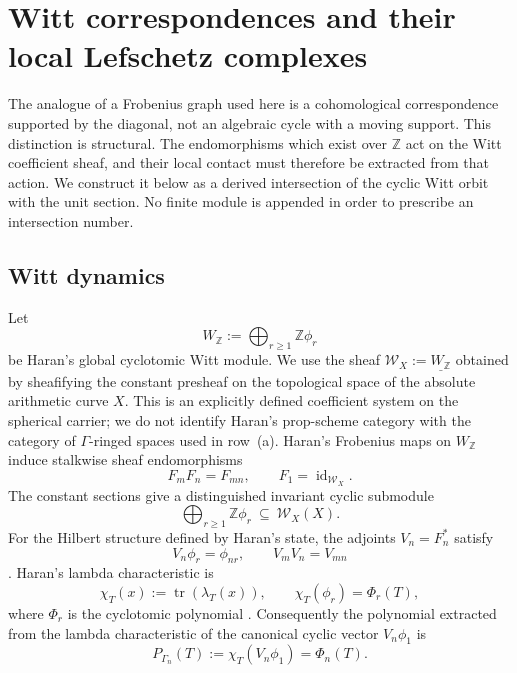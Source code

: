 \documentclass[11pt]{amsart}
\theoremstyle{definition}
\theoremstyle{remark}
\newcommand{\Z}{\mathbb Z}
\begin{document}
\section{Witt correspondences and their local Lefschetz complexes}
\label{sec:correspondences}

The analogue of a Frobenius graph used here is a cohomological
correspondence supported by the diagonal, not an algebraic cycle with a
moving support.  This distinction is structural.  The endomorphisms which
exist over $\Z$ act on the Witt coefficient sheaf, and their local contact
must therefore be extracted from that action.  We construct it below as a
derived intersection of the cyclic Witt orbit with the unit section.  No
finite module is appended in order to prescribe an intersection number.

\subsection{Witt dynamics}

Let
\[
 W_{\Z}:=\bigoplus_{r\geq1}\Z\phi_r
\]
be Haran's global cyclotomic Witt module.  We use the sheaf
$\mathcal W_X:=\underline{W_{\Z}}$ obtained by sheafifying the constant
presheaf on the topological space of the absolute arithmetic curve $X$.
This is an explicitly defined coefficient system on the spherical carrier;
we do not identify Haran's prop-scheme category with the category of
$\Gamma$-ringed spaces used in row~(a).  Haran's Frobenius maps on $W_\Z$
induce stalkwise sheaf endomorphisms
\begin{equation}\label{eq:Frobmult}
 F_mF_n=F_{mn},\qquad F_1=\operatorname{id}_{\mathcal W_X}.
\end{equation}
The constant sections give a distinguished invariant cyclic submodule
\begin{equation}\label{eq:Wittbasis}
 \bigoplus_{r\geq1}\Z\phi_r\ \subseteq\ \mathcal W_X(X).
\end{equation}
For the Hilbert structure defined by Haran's state, the adjoints
$V_n=F_n^*$ satisfy
\begin{equation}\label{eq:versch}
 V_n\phi_r=\phi_{nr},\qquad V_mV_n=V_{mn}
\end{equation}
\cite[(12.35),(12.37)]{Haran2022}.  Haran's lambda characteristic is
\begin{equation}\label{eq:HaranLambdaCharacteristic}
 \chi_T(x):=\operatorname{tr}(\lambda_T(x)),\qquad
 \chi_T(\phi_r)=\Phi_r(T),
\end{equation}
where $\Phi_r$ is the cyclotomic polynomial
\cite[(13.37)]{Haran2022}.  Consequently the polynomial extracted from the
lambda characteristic of the canonical cyclic vector $V_n\phi_1$ is
\begin{equation}\label{eq:dynamicPolynomial}
 P_{\Gamma_n}(T):=\chi_T(V_n\phi_1)=\Phi_n(T).
\end{equation}
\end{document}
